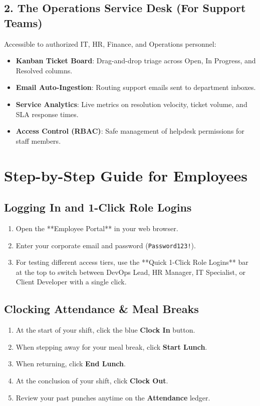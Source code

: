 \documentclass[a4paper,11pt]{article}
\begin{document}
\subsection{2. The Operations Service Desk (For Support Teams)}
Accessible to authorized IT, HR, Finance, and Operations personnel:
\begin{itemize}
    \item \textbf{Kanban Ticket Board}: Drag-and-drop triage across Open, In Progress, and Resolved columns.
    \item \textbf{Email Auto-Ingestion}: Routing support emails sent to department inboxes.
    \item \textbf{Service Analytics}: Live metrics on resolution velocity, ticket volume, and SLA response times.
    \item \textbf{Access Control (RBAC)}: Safe management of helpdesk permissions for staff members.
\end{itemize}

\section{Step-by-Step Guide for Employees}

\subsection{Logging In and 1-Click Role Logins}
\begin{enumerate}
    \item Open the **Employee Portal** in your web browser.
    \item Enter your corporate email and password (\texttt{Password123!}).
    \item For testing different access tiers, use the **Quick 1-Click Role Logins** bar at the top to switch between DevOps Lead, HR Manager, IT Specialist, or Client Developer with a single click.
\end{enumerate}

\subsection{Clocking Attendance \& Meal Breaks}
\begin{enumerate}
    \item At the start of your shift, click the blue \textbf{Clock In} button.
    \item When stepping away for your meal break, click \textbf{Start Lunch}.
    \item When returning, click \textbf{End Lunch}.
    \item At the conclusion of your shift, click \textbf{Clock Out}.
    \item Review your past punches anytime on the \textbf{Attendance} ledger.
\end{enumerate}
\end{document}

